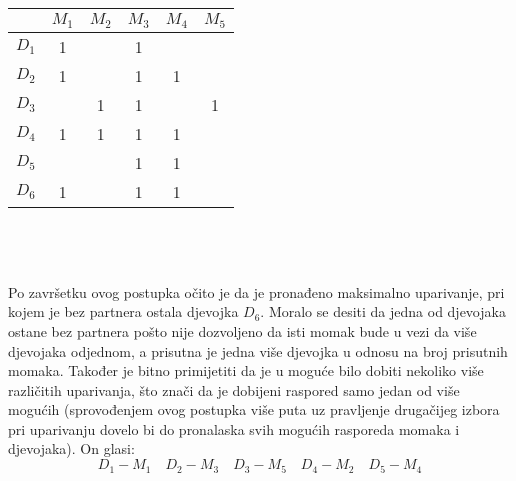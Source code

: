 \documentclass[12pt]{article}
\begin{document}
\begin{tabular}{|c|c|c|c|c|c|}
\hline
      & $M_1$                    & $M_2$                    & $M_3$                    & $M_4$                    & $M_5$                    \\ \hline
$D_1$ & {\color[HTML]{3166FF} 1} & {\color[HTML]{000000} }  & {\color[HTML]{FE0000} 1} & {\color[HTML]{000000} }  & {\color[HTML]{000000} }  \\ \hline
$D_2$ & {\color[HTML]{FE0000} 1} & {\color[HTML]{000000} }  & {\color[HTML]{3166FF} 1} & {\color[HTML]{FE0000} 1} & {\color[HTML]{000000} }  \\ \hline
$D_3$ & {\color[HTML]{000000} }  & {\color[HTML]{FE0000} 1} & {\color[HTML]{FE0000} 1} & {\color[HTML]{000000} }  & {\color[HTML]{3166FF} 1} \\ \hline
$D_4$ & {\color[HTML]{FE0000} 1} & {\color[HTML]{3166FF} 1} & {\color[HTML]{FE0000} 1} & {\color[HTML]{FE0000} 1} & {\color[HTML]{000000} }  \\ \hline
$D_5$ & {\color[HTML]{000000} }  & {\color[HTML]{000000} }  & {\color[HTML]{FE0000} 1} & {\color[HTML]{3166FF} 1} & {\color[HTML]{000000} }  \\ \hline
$D_6$ & {\color[HTML]{FE0000} 1} & {\color[HTML]{000000} }  & {\color[HTML]{FE0000} 1} & {\color[HTML]{FE0000} 1} & {\color[HTML]{000000} }  \\ \hline
\end{tabular}
\\
\\ \\
Po završetku ovog postupka očito je da je pronađeno maksimalno uparivanje, pri kojem je bez
partnera ostala djevojka $D_6$. Moralo se desiti da jedna od djevojaka ostane bez partnera pošto nije dozvoljeno da isti momak bude u vezi da više djevojaka odjednom, a prisutna je jedna više djevojka u odnosu na broj prisutnih momaka. Također je bitno primijetiti da je u moguće bilo dobiti nekoliko više različitih uparivanja, što znači da je dobijeni raspored samo jedan od više mogućih (sprovođenjem ovog postupka više puta uz pravljenje drugačijeg izbora pri uparivanju dovelo bi
do pronalaska svih mogućih rasporeda momaka i djevojaka). On
glasi:
\begin{equation*}
    D_1 - M_1 \quad D_2 - M_3 \quad D_3 - M_5 \quad D_4 - M_2 \quad D_5 - M_4 
\end{equation*}
\end{document}
